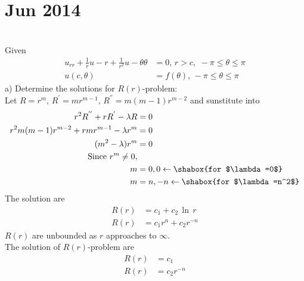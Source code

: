 \chapter{Jun 2014}
\\
Given 
\begin{align*}
u_{rr}+\frac{1}{r}u-r+\frac{1}{r^2}u-{\theta\theta}&=0,\,r>c,\,\,-\pi\le\theta\le\pi\\
u(c,\theta)&=f(\theta),\,-\pi\le\theta\le\pi
\end{align*}
a) Determine the solutions for $R(r)$-problem:\\
Let $R=r^m,\,R^{'}=mr^{m-1},\,R^{''}=m(m-1)r^{m-2}$ and sunstitute into
\begin{align}
r^2R^{''}+rR^{'}-\lambda R&=0\\
r^2m(m-1)r^{m-2}+rmr^{m-1}-\lambda r^m&=0\\
(m^2-\lambda)r^m&=0\\
\text{Since $r^m\neq 0$},&\\
m&=0,0\leftarrow\shabox{for $\lambda=0$}\\
m&=n,-n\leftarrow\shabox{for $\lambda=n^2$}
\end{align}
The solution are
\begin{align}
R(r)&=c_1+c_2\,\ln\,r\label{q5j14a}\\
R(r)&=c_1r^n+c_2r^{-n}\label{q5j14b}
\end{align}
$R(r)$ are unbounded as $r$ approaches to $\infty$.\\
The solution of $R(r)$-problem are
\begin{align}
R(r)&=c_1\\
R(r)&=c_2r^{-n}
\end{align}


